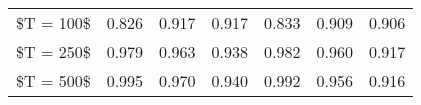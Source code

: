 % 
\begin{tabular}{ccccccc}
  \hline
  \hline
\$T = 100\$ & 0.826 & 0.917 & 0.917 & 0.833 & 0.909 & 0.906 \\ 
  \$T = 250\$ & 0.979 & 0.963 & 0.938 & 0.982 & 0.960 & 0.917 \\ 
  \$T = 500\$ & 0.995 & 0.970 & 0.940 & 0.992 & 0.956 & 0.916 \\ 
   \hline
\end{tabular}
